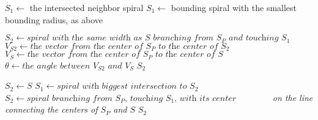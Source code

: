 \begin{algorithm*}
\begin{algorithmic}[1]
			\State $S_{1} \gets$ the intersected neighbor spiral
		\Else
			\State $S_{1} \gets$ bounding spiral with the smallest bounding radius, as above
		\EndIf		
		\State
			
		\State $S_{2} \gets \textit{spiral with the same width as $S$ branching from $S_{P}$ and touching $S_{1}$}$
			\State $V_{S2} \gets \textit{the vector from the center of $S_{P}$ to the center of $S_{2}$}$
			\State $V_{S} \gets \textit{the vector from the center of $S_{P}$ to the center of $S$}$
			\State $\theta \gets \textit{the angle between $V_{S2}$ and $V_{S}$}$
			\If{$\theta \leq 12.5\degree$}
				\State \Return $S_{2}$
			\EndIf
		\EndIf
		\State
			
		\State $S_{2} \gets S$
			\State $S_{1} \gets \textit{spiral with biggest intersection to $S_{2}$}$
			\State $S_{2} \gets \textit{spiral branching from $S_{P}$, touching $S_{1}$, with its center}$
			\State \textit{~~~~~~~ on the line connecting the centers of $S_{P}$ and $S$}
		\EndWhile
		\State \Return $S_{2}$
	\EndFunction
\end{algorithmic}
\end{algorithm*}